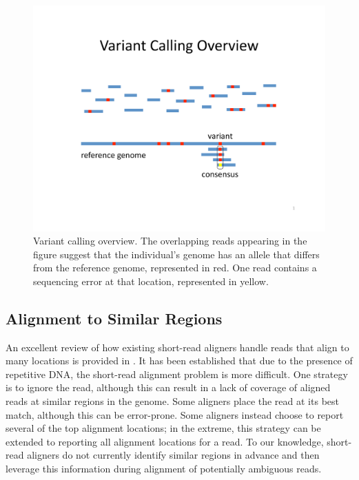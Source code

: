 \documentclass[twocolumn,10pt]{article}
\begin{document}
\begin{figure}
\centering
\includegraphics[scale=0.6]{variantCalling.pdf}
\caption{Variant calling overview.  The overlapping reads appearing in the figure suggest that the individual's genome has an allele that differs from the reference genome, represented in red.  One read contains a sequencing error at that location, represented in yellow.}
\label{fig:variantCalling}
\end{figure}

\subsection{Alignment to Similar Regions}

An excellent review of how existing short-read aligners handle reads that align to many locations is provided in \cite{Treangen:2012}.  It has been established that due to the presence of repetitive DNA, the short-read alignment problem is more difficult.  One strategy is to ignore the read, although this can result in a lack of coverage of aligned reads at similar regions in the genome.  Some aligners place the read at its best match, although this can be error-prone.  Some aligners instead choose to report several of the top alignment locations; in the extreme, this strategy can be extended to reporting all alignment locations for a read.  To our knowledge, short-read aligners do not currently identify similar regions in advance and then leverage this information during alignment of potentially ambiguous reads.
\end{document}
